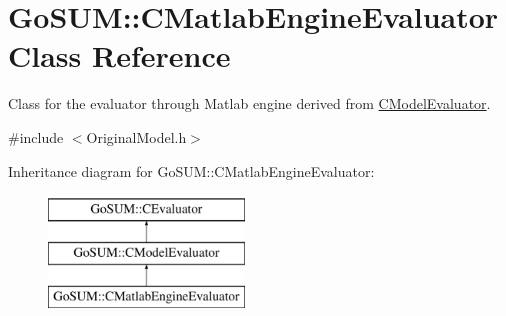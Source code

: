 \hypertarget{class_go_s_u_m_1_1_c_matlab_engine_evaluator}{\section{Go\-S\-U\-M\-:\-:C\-Matlab\-Engine\-Evaluator Class Reference}
\label{class_go_s_u_m_1_1_c_matlab_engine_evaluator}
}


Class for the evaluator through Matlab engine derived from \hyperlink{class_go_s_u_m_1_1_c_model_evaluator}{C\-Model\-Evaluator}.  




{\ttfamily \#include $<$Original\-Model.\-h$>$}

Inheritance diagram for Go\-S\-U\-M\-:\-:C\-Matlab\-Engine\-Evaluator\-:\begin{figure}[H]
\begin{center}
\leavevmode
\includegraphics[height=3.000000cm]{class_go_s_u_m_1_1_c_matlab_engine_evaluator}
\end{center}
\end{figure}
